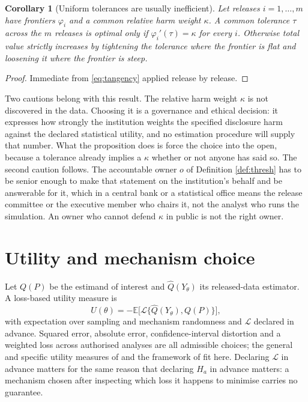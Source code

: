 \documentclass[11pt,a4paper]{article}
\theoremstyle{plain}
\newtheorem{corollary}[proposition]{Corollary}
\theoremstyle{definition}
\newcommand{\E}{\mathbb{E}}
\begin{document}
\begin{corollary}[Uniform tolerances are usually inefficient]\label{cor:uniform}
Let releases $i = 1, \dots, m$ have frontiers $\varphi_i$ and a common relative
harm weight $\kappa$. A common tolerance $\tau$ across the $m$ releases is optimal
only if $\varphi_i'(\tau) = \kappa$ for every $i$. Otherwise total value
strictly increases by tightening the tolerance where the frontier is flat and
loosening it where the frontier is steep.
\end{corollary}

\begin{proof}
Immediate from \eqref{eq:tangency} applied release by release.
\end{proof}

Two cautions belong with this result. The relative harm weight $\kappa$ is not
discovered in the data. Choosing it is a governance and ethical decision: it expresses how strongly
the institution weights the specified disclosure harm against the declared
statistical utility, and no estimation procedure
will supply that number. What the proposition does is force the choice into the
open, because a tolerance already implies a $\kappa$ whether or not anyone has
said so. The second caution follows. The accountable owner $o$ of Definition
\ref{def:thresh} has to be senior enough to make that statement on the
institution's behalf and be answerable for it, which in a central bank or a
statistical office means the release committee or the executive member who chairs
it, not the analyst who runs the simulation. An owner who cannot defend $\kappa$
in public is not the right owner.

\section{Utility and mechanism choice}\label{sec:ru}

Let $Q(P)$ be the estimand of interest and $\widehat{Q}(Y_\theta)$ its
released-data estimator. A loss-based utility measure is
\begin{equation}
U(\theta) = -\E\big[ \mathcal{L}\{\widehat{Q}(Y_\theta), Q(P)\} \big] ,
\label{eq:util}
\end{equation}
with expectation over sampling and mechanism randomness and $\mathcal{L}$
declared in advance. Squared error, absolute error, confidence-interval distortion and a
weighted loss across authorised analyses are all admissible choices; the
general and specific utility measures of \citet{snoke2018} and the framework of
\citet{karr2006} fit here. Declaring $\mathcal{L}$ in advance matters for the same reason
that declaring $H_a$ in advance matters: a mechanism chosen after inspecting
which loss it happens to minimise carries no guarantee.
\end{document}
